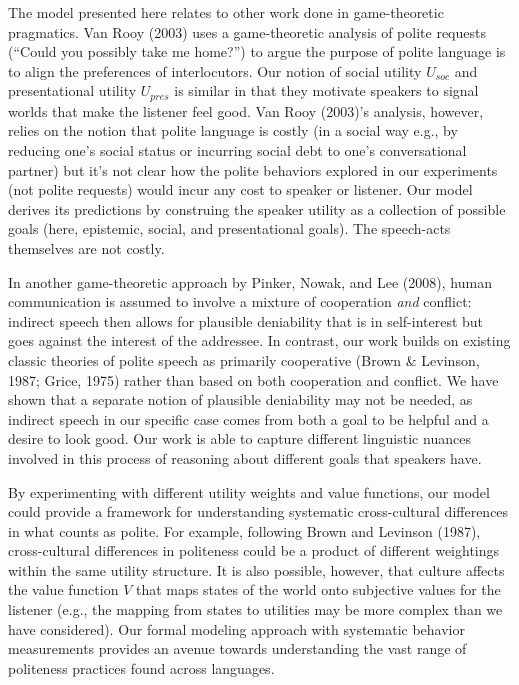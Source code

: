 \documentclass[floatsintext,man]{apa6}
\theoremstyle{definition}
\theoremstyle{definition}
\theoremstyle{definition}
\theoremstyle{remark}
\begin{document}
The model presented here relates to other work done in game-theoretic
pragmatics. Van Rooy (2003) uses a game-theoretic analysis of polite
requests (\enquote{Could you possibly take me home?}) to argue the
purpose of polite language is to align the preferences of interlocutors.
Our notion of social utility \(U_{soc}\) and presentational utility
\(U_{pres}\) is similar in that they motivate speakers to signal worlds
that make the listener feel good. Van Rooy (2003)'s analysis, however,
relies on the notion that polite language is costly (in a social way
e.g., by reducing one's social status or incurring social debt to one's
conversational partner) but it's not clear how the polite behaviors
explored in our experiments (not polite requests) would incur any cost
to speaker or listener. Our model derives its predictions by construing
the speaker utility as a collection of possible goals (here, epistemic,
social, and presentational goals). The speech-acts themselves are not
costly.

In another game-theoretic approach by Pinker, Nowak, and Lee (2008),
human communication is assumed to involve a mixture of cooperation
\emph{and} conflict: indirect speech then allows for plausible
deniability that is in self-interest but goes against the interest of
the addressee. In contrast, our work builds on existing classic theories
of polite speech as primarily cooperative (Brown \& Levinson, 1987;
Grice, 1975) rather than based on both cooperation and conflict. We have
shown that a separate notion of plausible deniability may not be needed,
as indirect speech in our specific case comes from both a goal to be
helpful and a desire to look good. Our work is able to capture different
linguistic nuances involved in this process of reasoning about different
goals that speakers have.

By experimenting with different utility weights and value functions, our
model could provide a framework for understanding systematic
cross-cultural differences in what counts as polite. For example,
following Brown and Levinson (1987), cross-cultural differences in
politeness could be a product of different weightings within the same
utility structure. It is also possible, however, that culture affects
the value function \(V\) that maps states of the world onto subjective
values for the listener (e.g., the mapping from states to utilities may
be more complex than we have considered). Our formal modeling approach
with systematic behavior measurements provides an avenue towards
understanding the vast range of politeness practices found across
languages.
\end{document}
